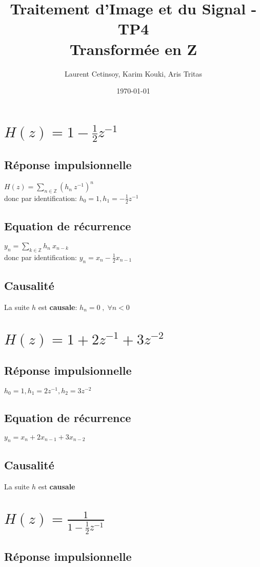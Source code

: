 \documentclass[twocolumn]{article}
\title{Traitement d'Image et du Signal - TP4 \\ Transformée en Z}
\author{Laurent Cetinsoy, Karim Kouki, Aris Tritas }
\date{\today}
\begin{document}
\maketitle
\section{$H(z) = 1 - \frac{1}{2}z^{-1}$}
\subsection*{Réponse impulsionnelle}
$H(z) = \displaystyle\sum_{n \in \mathbb{Z}}{(h_n  \: z^{-1})^{n}}$ \\ donc par identification:
$h_0 = 1, h_1 = -\frac{1}{2}z^{-1}$
\subsection*{Equation de récurrence}
$y_n = \displaystyle\sum_{k \in \mathbb{Z}}{h_n  \: x_{n-k}}$ \\ donc par identification:
$y_n = x_n - \frac{1}{2}x_{n-1}$
\subsection*{Causalité}
La suite $h$ est \textbf{causale}: $h_n = 0 \;,\; \forall n < 0$
\section{$H(z) = 1 +2z^{-1} +3z^{-2}$}
\subsection*{Réponse impulsionnelle}
$h_0 = 1, h_1 = 2z^{-1}, h_2 = 3z^{-2}$
\subsection*{Equation de récurrence}
$y_n = x_n +2x_{n-1} +3x_{n-2}$
\subsection*{Causalité}
La suite $h$ est \textbf{causale}
\section{$H(z) = \frac{1}{1 - \frac{1}{2}z^{-1}}$}
\subsection*{Réponse impulsionnelle}
\end{document}

